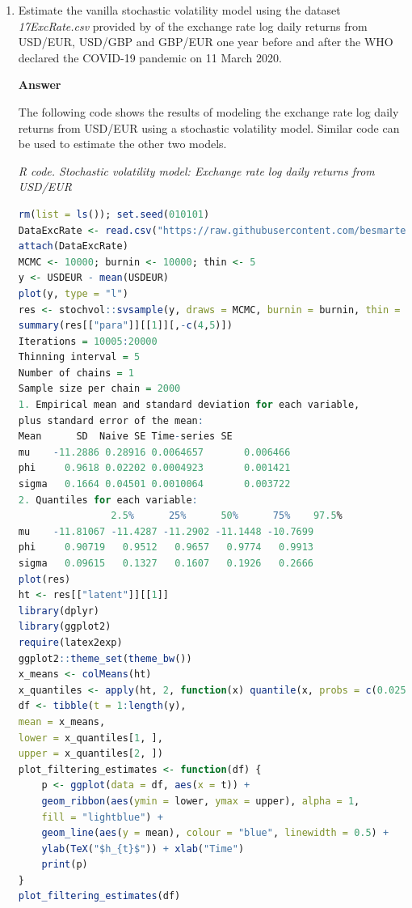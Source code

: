 \begin{enumerate}[leftmargin=*]
\item Estimate the vanilla stochastic volatility model using the dataset \textit{17ExcRate.csv} provided by \cite{ramirez2024testing} of the exchange rate log daily returns from USD/EUR, USD/GBP and GBP/EUR one year before and after the WHO declared the COVID-19 pandemic on 11 March 2020. 

\textbf{Answer}

The following code shows the results of modeling the exchange rate log daily returns from USD/EUR using a stochastic volatility model. Similar code can be used to estimate the other two models.

\begin{tcolorbox}[enhanced,width=4.67in,center upper,
	fontupper=\large\bfseries,drop shadow southwest,sharp corners]
	\textit{R code. Stochastic volatility model: Exchange rate log daily returns from USD/EUR}
	\begin{VF}
		\begin{lstlisting}[language=R]
rm(list = ls()); set.seed(010101)
DataExcRate <- read.csv("https://raw.githubusercontent.com/besmarter/BSTApp/refs/heads/master/DataApp/17ExcRate.csv", sep = ",", header = TRUE, quote = "")
attach(DataExcRate)
MCMC <- 10000; burnin <- 10000; thin <- 5
y <- USDEUR - mean(USDEUR)
plot(y, type = "l")
res <- stochvol::svsample(y, draws = MCMC, burnin = burnin, thin = thin, priormu = c(0, 100), priorsigma = c(1), priorphi = c(5, 1.5), priorbeta =  c(0, 10000))
summary(res[["para"]][[1]][,-c(4,5)])
Iterations = 10005:20000
Thinning interval = 5 
Number of chains = 1 
Sample size per chain = 2000 
1. Empirical mean and standard deviation for each variable,
plus standard error of the mean:
Mean      SD  Naive SE Time-series SE
mu    -11.2886 0.28916 0.0064657       0.006466
phi     0.9618 0.02202 0.0004923       0.001421
sigma   0.1664 0.04501 0.0010064       0.003722
2. Quantiles for each variable:
				2.5%      25%      50%      75%    97.5%
mu    -11.81067 -11.4287 -11.2902 -11.1448 -10.7699
phi     0.90719   0.9512   0.9657   0.9774   0.9913
sigma   0.09615   0.1327   0.1607   0.1926   0.2666
plot(res)
ht <- res[["latent"]][[1]]
library(dplyr)
library(ggplot2)
require(latex2exp)
ggplot2::theme_set(theme_bw())
x_means <- colMeans(ht)
x_quantiles <- apply(ht, 2, function(x) quantile(x, probs = c(0.025, 0.975)))
df <- tibble(t = 1:length(y),
mean = x_means,
lower = x_quantiles[1, ],
upper = x_quantiles[2, ])
plot_filtering_estimates <- function(df) {
	p <- ggplot(data = df, aes(x = t)) +
	geom_ribbon(aes(ymin = lower, ymax = upper), alpha = 1,
	fill = "lightblue") +
	geom_line(aes(y = mean), colour = "blue", linewidth = 0.5) +
	ylab(TeX("$h_{t}$")) + xlab("Time")
	print(p)
}
plot_filtering_estimates(df)
\end{lstlisting}
	\end{VF}
\end{tcolorbox} 


\end{enumerate}
